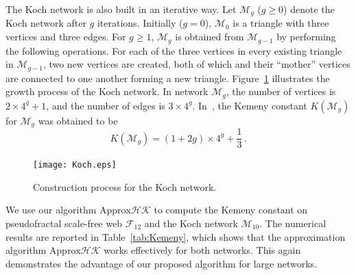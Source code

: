 \documentclass[sigconf]{acmart}
\begin{document}
The Koch network is also built in an iterative way. Let $\mathcal{M}_{g}$ ($g \geq 0$) denote the Koch network after $g$ iterations. Initially ($g=0$), $\mathcal{M}_{0}$ is a triangle with three
vertices and three edges. For $g\geq 1$, $\mathcal{M}_{g}$ is obtained from $\mathcal{M}_{g-1}$ by
performing the following operations. For each of the three vertices in
every existing triangle in $\mathcal{M}_{g-1}$, two new vertices are created, both of which and their
``mother'' vertices are connected to one another forming a new triangle. Figure~\ref{network} illustrates the growth process of the Koch network.  In network $\mathcal{M}_{g}$, the number of vertices is $2\times 4^{g}+1$, and the number of
edges is $3\times 4^{g}$.  In~\cite{XiLiZh15}, the Kemeny constant $K(\mathcal{M}_g)$ for $\mathcal{M}_g$ was obtained to be
\begin{equation}\label{Kg02}
	K(\mathcal{M}_g)=(1+2g)\times 4^g+\frac{1}{3}\,. %
\end{equation}

\begin{figure}
	\centering
	\texttt{[image: Koch.eps]}
	\caption{Construction process for the Koch network.}
	\label{network}
\end{figure}

We use our  algorithm $\text{Approx}\mathcal{HK}$ to compute the Kemeny constant on  pseudofractal scale-free web $\mathcal{F}_{12}$ and the Koch network $\mathcal{M}_{10}$. The numerical results are reported in  Table~\ref{tab:Kemeny}, which shows that the approximation algorithm $\text{Approx}\mathcal{HK}$ works effectively for both networks. This again demonstrates the advantage of our proposed algorithm for large networks.
\end{document}
